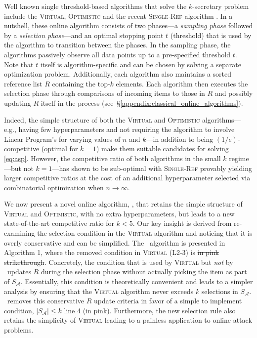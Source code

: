 Well known single threshold-based algorithms that solve the $k$-secretary problem include the \textsc{Virtual}, \textsc{Optimistic} \cite{babaioff2007knapsack} and the recent \textsc{Single-Ref} algorithm \cite{albers2020new}. In a nutshell, these online algorithm consists of two phases---a \textit{sampling phase} followed by a \textit{selection phase}---and an optimal stopping point $t$ (threshold) that is used by the algorithm to transition between the phases. In the sampling phase, the algorithms passively observe all data points up to a pre-specified threshold $t$. Note that $t$ itself is algorithm-specific and can be chosen by solving a separate optimization problem. Additionally, each algorithm also maintains a sorted reference list $R$ containing the top-$k$ elements. Each algorithm then executes the selection phase through comparisons of incoming items to those in $R$ and possibly updating $R$ itself in the process (see~\S\ref{appendix:classical_online_algorithms}).

Indeed, the simple structure of both the \textsc{Virtual} and \textsc{Optimistic} algorithms---e.g., having few hyperparameters and not requiring the algorithm to involve Linear Program's for varying values of $n$ and $k$---in addition to being $(1/e)$-competitive (optimal for $k=1$) make them suitable candidates for solving \eqref{eq:asp}. However, 
the competitive ratio of both algorithms in the small $k$ regime---but not $k=1$---has shown to be sub-optimal with \textsc{Single-Ref} provably yielding larger competitive ratios at the cost of an additional hyperparameter selected via combinatorial optimization when $n \to \infty$. 

We now present a novel online algorithm, \algoname, that retains the simple structure of \textsc{Virtual} and \textsc{Optimistic}, with no extra hyperparameters, but leads to a new state-of-the-art competitive ratio for $k<5$. Our key insight is derived from re-examining the selection condition in the \textsc{Virtual} algorithm and noticing that it is overly conservative and can be simplified. The \algoname\ algorithm is presented in Algorithm 1, where the removed condition in \textsc{Virtual} (L2-3) is \st{in pink strikethrough}. Concretely, the condition that is used by \textsc{Virtual} but \emph{not} by \algoname\ updates $R$ during the selection phase without actually picking the item as part of $S_{\mathcal{A}}$. Essentially, this condition is theoretically convenient and leads to a simpler analysis by ensuring that the \textsc{Virtual} algorithm never exceeds $k$ selections in $S_{\mathcal{A}}$. \algoname\ removes this conservative $R$ update criteria in favor of a simple to implement condition, $|S_{\mathcal{A}}| \leq k$ line 4 {\color{salmon}(in pink)}. Furthermore, the new selection rule also retains the simplicity of \textsc{Virtual} leading to a painless application to online attack problems.

